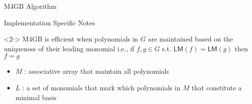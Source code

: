 \documentclass{beamer}
\newcommand{\LM}[1]{\mathsf{LM}(#1)}
\newcommand{\Alg}[2]{\textsc{#1}(#2)}
\newcommand{\Update}[1]{\Alg{Update}{#1}}
\begin{document}
\begin{section}{M4GB Algorithm}
\begin{frame}
  \end{frame}

  \begin{frame}{Implementation Specific Notes}
    \begin{block}<2->{}
      M4GB is efficient when polynomials in $G$ are maintained based on the uniqueness of their leading monomial i.e., if $f, g \in G$ s.t. $\LM{f} = \LM{g}$ then $f = g$
    \end{block}

    \begin{itemize}
        \item<3-> $M$ : associative array that maintain all polynomials
        \item<4-> $L$ : a set of monomials that mark which polynomials in $M$ that constitute a minimal basis
      \end{itemize}
    
  \end{frame}
  
  
  
\end{section}
\end{document}
